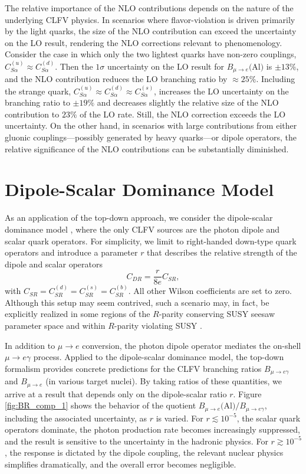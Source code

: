 \documentclass{book}[letterpaper,12pt]
\begin{document}
The relative importance of the NLO contributions depends on the nature of the underlying CLFV physics. In scenarios where flavor-violation is driven primarily by the light quarks, the size of the NLO contribution can exceed the uncertainty on the LO result, rendering the NLO corrections relevant to phenomenology. Consider the case in which only the two lightest quarks have non-zero couplings, $C^{(u)}_{S\alpha}\approx C^{(d)}_{S\alpha}$. Then the $1\sigma$ uncertainty on the LO result for $B_{\mu\rightarrow e}($Al$)$ is $\pm 13\%$, and the NLO contribution reduces the LO branching ratio by $\approx 25\%$. Including the strange quark, $C^{(u)}_{S\alpha}\approx C^{(d)}_{S\alpha}\approx C^{(s)}_{S\alpha}$, increases the LO uncertainty on the branching ratio to $\pm 19\%$ and decreases slightly the relative size of the NLO contribution to $23\%$ of the LO rate. Still, the NLO correction exceeds the LO uncertainty. On the other hand, in scenarios with large contributions from either gluonic couplings---possibly generated by heavy quarks---or dipole operators, the relative significance of the NLO contributions can be substantially diminished.
\section{Dipole-Scalar Dominance Model}
As an application of the top-down approach, we consider the dipole-scalar dominance model \cite{Cirigliano:2009bz}, where the only CLFV sources are the photon dipole and scalar quark operators. For simplicity, we limit to right-handed down-type quark operators and introduce a parameter $r$ that describes the relative strength of the dipole and scalar operators 
\begin{equation}
C_{DR}=\frac{r}{8e}C_{SR},
\end{equation} 
with $C_{SR}=C_{SR}^{(d)}=C_{SR}^{(s)}=C_{SR}^{(b)}$. All other Wilson coefficients are set to zero. Although this setup may seem contrived, such a scenario may, in fact, be explicitly realized in some regions of the $R$-parity conserving SUSY seesaw parameter space \cite{KITANO2003300} and within $R$-parity violating SUSY \cite{PhysRevD.56.100,HUITU1998355,FAESSLER200025}. 

In addition to $\mu\rightarrow e$ conversion, the photon dipole operator mediates the on-shell $\mu\rightarrow e\gamma$ process. Applied to the dipole-scalar dominance model, the top-down formalism provides concrete predictions for the CLFV branching ratios $B_{\mu\rightarrow e\gamma}$ and $B_{\mu\rightarrow e}$ (in various target nuclei). By taking ratios of these quantities, we arrive at a result that depends only on the dipole-scalar ratio $r$. Figure \ref{fig:BR_comp_1} shows the behavior of the quotient $B_{\mu\rightarrow e}($Al$)/B_{\mu\rightarrow e\gamma}$, including the associated uncertainty, as $r$ is varied. For $r\lesssim 10^{-5}$, the scalar quark operators dominate, the photon production rate becomes increasingly suppressed, and the result is sensitive to the uncertainty in the hadronic physics. For $r\gtrsim 10^{-5}$, the response is dictated by the dipole coupling, the relevant nuclear physics simplifies dramatically, and the overall error becomes negligible.
\end{document}
